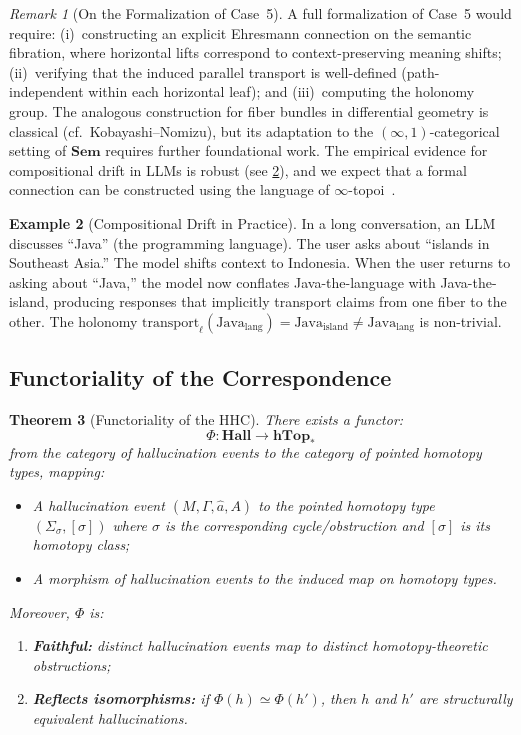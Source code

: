 \documentclass[11pt,a4paper]{article}
\theoremstyle{plain}
\newtheorem{theorem}{Theorem}[section]
\theoremstyle{definition}
\newtheorem{example}[theorem]{Example}
\theoremstyle{remark}
\newtheorem{remark}[theorem]{Remark}
\newcommand{\Sem}{\mathbf{Sem}}
\newcommand{\transport}{\mathrm{transport}}
\newcommand{\Hall}{\mathbf{Hall}}
\newcommand{\hTop}{\mathbf{hTop}_*}
\begin{document}
\begin{remark}[On the Formalization of Case~5]
\label{rem:case5-formalization}
A full formalization of Case~5 would require: (i)~constructing an explicit Ehresmann connection on the semantic fibration, where horizontal lifts correspond to context-preserving meaning shifts; (ii)~verifying that the induced parallel transport is well-defined (path-independent within each horizontal leaf); and (iii)~computing the holonomy group. The analogous construction for fiber bundles in differential geometry is classical (cf.\ Kobayashi--Nomizu), but its adaptation to the $(\infty,1)$-categorical setting of $\Sem$ requires further foundational work. The empirical evidence for compositional drift in LLMs is robust (see \cref{ex:drift}), and we expect that a formal connection can be constructed using the language of $\infty$-topoi~\cite{lurie2009}.
\end{remark}

\begin{example}[Compositional Drift in Practice]
\label{ex:drift}
In a long conversation, an LLM discusses ``Java'' (the programming language). The user asks about ``islands in Southeast Asia.'' The model shifts context to Indonesia. When the user returns to asking about ``Java,'' the model now conflates Java-the-language with Java-the-island, producing responses that implicitly transport claims from one fiber to the other. The holonomy $\transport_\ell(\text{Java}_{\text{lang}}) = \text{Java}_{\text{island}} \neq \text{Java}_{\text{lang}}$ is non-trivial.
\end{example}

\subsection{Functoriality of the Correspondence}

\begin{theorem}[Functoriality of the HHC]
\label{thm:functoriality}
There exists a functor:
\[
\Phi: \Hall \to \hTop
\]
from the category of hallucination events to the category of pointed homotopy types, mapping:
\begin{itemize}[nosep]
  \item A hallucination event $(M, \Gamma, \hat{a}, A)$ to the pointed homotopy type $(\Sigma_\sigma, [\sigma])$ where $\sigma$ is the corresponding cycle/obstruction and $[\sigma]$ is its homotopy class;
  \item A morphism of hallucination events to the induced map on homotopy types.
\end{itemize}
Moreover, $\Phi$ is:
\begin{enumerate}[nosep]
  \item \textbf{Faithful:} distinct hallucination events map to distinct homotopy-theoretic obstructions;
  \item \textbf{Reflects isomorphisms:} if $\Phi(h) \simeq \Phi(h')$, then $h$ and $h'$ are structurally equivalent hallucinations.
\end{enumerate}
\end{theorem}
\end{document}
